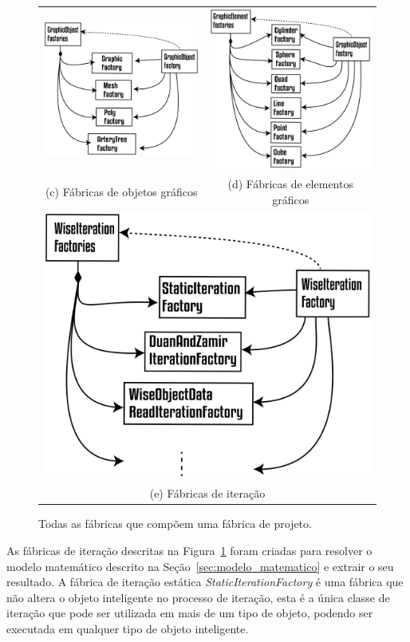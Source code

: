 \begin{figure}
\begin{tabularx}{\textwidth}{cc}
		\includegraphics[width=0.5\linewidth]{Figures/GraphicObjectFactories@16x.png} &   \includegraphics[width=0.5\linewidth]{Figures/GraphicElementFactories@16x.png} \\
		(c) Fábricas de objetos gráficos & (d) Fábricas de elementos gráficos \\[6pt]
		\multicolumn{2}{c}{\includegraphics[width=0.5\linewidth]{Figures/WiseIterationFactories@16x.png} }\\
		\multicolumn{2}{c}{(e) Fábricas de iteração}
	\end{tabularx}
	\caption{Todas as fábricas que compõem uma fábrica de projeto.}
	\label{tab:factories} 
\end{figure}

 As fábricas de iteração descritas na Figura~\ref{tab:factories} foram criadas para resolver o modelo matemático descrito na Seção~\ref{sec:modelo_matematico} e extrair o seu resultado. A fábrica de iteração estática \textit{StaticIterationFactory} é uma fábrica que não altera o objeto inteligente no processo de iteração, esta é a única classe de iteração que pode ser utilizada em mais de um tipo de objeto, podendo ser executada em qualquer tipo de objeto inteligente.

